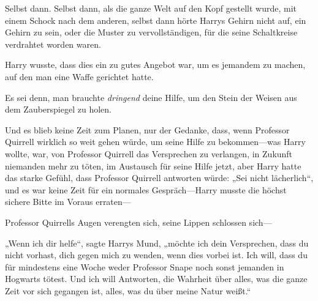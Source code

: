 \later


Selbst dann. Selbst dann, als die ganze Welt auf den Kopf gestellt wurde, mit einem Schock nach dem anderen, selbst dann hörte Harrys Gehirn nicht auf, ein Gehirn zu sein, oder die Muster zu vervollständigen, für die seine Schaltkreise verdrahtet worden waren.

Harry wusste, dass dies ein zu gutes Angebot war, um es jemandem zu machen, auf den man eine Waffe gerichtet hatte.

Es sei denn, man brauchte \emph{dringend} deine Hilfe, um den Stein der Weisen aus dem Zauberspiegel zu holen.

Und es blieb keine Zeit zum Planen, nur der Gedanke, dass, wenn Professor Quirrell wirklich so weit gehen würde, um seine Hilfe zu bekommen—was Harry wollte, war, von Professor Quirrell das Versprechen zu verlangen, in Zukunft niemanden mehr zu töten, im Austausch für seine Hilfe jetzt, aber Harry hatte das starke Gefühl, dass Professor Quirrell antworten würde: „Sei nicht lächerlich“, und es war keine Zeit für ein normales Gespräch—Harry musste die höchst sichere Bitte im Voraus erraten—

Professor Quirrells Augen verengten sich, seine Lippen schlossen sich—

„Wenn ich dir helfe“, sagte Harrys Mund, „möchte ich dein Versprechen, dass du nicht vorhast, dich gegen mich zu wenden, wenn dies vorbei ist. Ich will, dass du für mindestens eine Woche weder Professor Snape noch sonst jemanden in Hogwarts tötest. Und ich will Antworten, die Wahrheit über alles, was die ganze Zeit vor sich gegangen ist, alles, was du über meine Natur weißt.“

